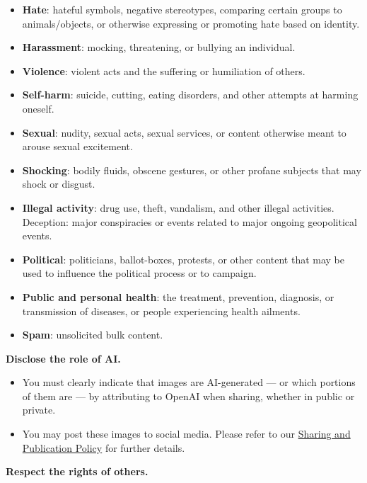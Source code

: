 \begin{itemize}
\item \textbf{Hate}: hateful symbols, negative stereotypes, comparing certain
    groups to animals/objects, or otherwise expressing or promoting hate based
    on identity.
\item \textbf{Harassment}: mocking, threatening, or bullying an individual.
\item \textbf{Violence}: violent acts and the suffering or humiliation of
    others.
\item \textbf{Self-harm}: suicide, cutting, eating disorders, and other attempts
    at harming oneself.
\item \textbf{Sexual}: nudity, sexual acts, sexual services, or content
    otherwise meant to arouse sexual excitement.
\item \textbf{Shocking}: bodily fluids, obscene gestures, or other profane
    subjects that may shock or disgust.
\item \textbf{Illegal activity}: drug use, theft, vandalism, and other illegal
    activities. Deception: major conspiracies or events related to major ongoing
    geopolitical events.
\item \textbf{Political}: politicians, ballot-boxes, protests, or other content
    that may be used to influence the political process or to campaign.
\item \textbf{Public and personal health}: the treatment, prevention, diagnosis,
    or transmission of diseases, or people experiencing health ailments.
\item \textbf{Spam}: unsolicited bulk content.
\end{itemize}


\vspace{.5em}\noindent\textbf{Disclose the role of AI.}

\begin{itemize}
\item You must clearly indicate that images are AI-generated --- or which
    portions of them are --- by attributing to OpenAI when sharing, whether in
    public or private.
\item You may post these images to social media. Please refer to our
    \href{https://web.archive.org/web/20220803232350/https://openai.com/api/policies/sharing-publication/}{Sharing
    and Publication Policy} for further details.
\end{itemize}


\vspace{.5em}\noindent\textbf{Respect the rights of others.}

